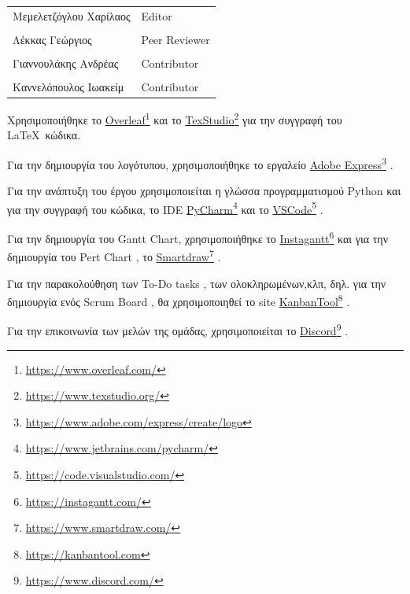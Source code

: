 \documentclass{../ol-softwaremanual}
\newcommand{\doclink}[2]{\href{#1}{#2}\footnote{\url{#1}}}
\begin{document}
	
	\vspace{20pt}
	
	\begin{table}[htbp!]
		\begin{tabular}{ll}
			Μεμελετζόγλου Χαρίλαος & \en Editor \\
			\\ Λέκκας Γεώργιος      &   \en  Peer Reviewer \\
			\\ Γιαννουλάκης Ανδρέας & \en Contributor \\
			\\ Καννελόπουλος Ιωακείμ & \en Contributor \\ 
		\end{tabular}
	\end{table}
	
	
	\vspace{20pt}
	
	
	\vspace{20pt}
	\flushleft
	Χρησιμοποιήθηκε το \en \doclink{https://www.overleaf.com/}{Overleaf} \gr και το \en \doclink{https://www.texstudio.org/}{TexStudio} \gr για την συγγραφή του \LaTeX\ κώδικα. \break
	
	Για την δημιουργία του λογότυπου, χρησιμοποιήθηκε το εργαλείο \en \doclink{https://www.adobe.com/express/create/logo}{Adobe Express} . \gr \break
	
	Για την ανάπτυξη του έργου χρησιμοποιείται η γλώσσα προγραμματισμού \en Python \gr και για την συγγραφή του κώδικα, το \en IDE \doclink{https://www.jetbrains.com/pycharm/}{PyCharm} \gr και το \en \doclink{https://code.visualstudio.com/}{VSCode} \gr .         \\ \break
	
	Για την δημιουργία του \en Gantt Chart, \gr χρησιμοποιήθηκε το \en \doclink{https://instagantt.com/}{Instagantt}  \gr και για την δημιουργία του \en Pert Chart \gr, το \en \doclink{https://www.smartdraw.com/}{Smartdraw} \gr. \break
	
	Για την παρακολούθηση των \en To-Do tasks \gr, των ολοκληρωμένων,κλπ, δηλ. για την δημιουργία ενός \en Scrum Board \gr, θα χρησιμοποιηθεί το \en site \doclink{https://kanbantool.com}{KanbanTool} \gr. \break 
	
	Για την επικοινωνία των μελών της ομάδας, χρησιμοποιείται το \en \doclink{ https://www.discord.com/}{Discord} \gr . \linebreak 
	
\end{document}
